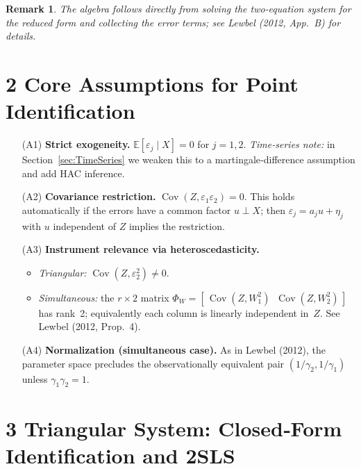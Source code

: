 \documentclass{article}
\newcommand{\E}{\mathbb{E}}
\newcommand{\cov}{\operatorname{Cov}}
\theoremstyle{plain}
\newtheorem{remark}{Remark}
\begin{document}
\begin{remark}
The algebra follows directly from solving the two‑equation system for the
reduced form and collecting the error terms; see Lewbel (2012, App.\ B) for
details.
\end{remark}

\section*{2 \quad Core Assumptions for Point Identification}

\begin{enumerate}
\item[(A1)] \textbf{Strict exogeneity.}
      $\E[\varepsilon_j\mid X]=0$ for $j=1,2$.  
      \emph{Time‑series note:} in Section~\ref{sec:TimeSeries} we weaken this to a martingale‑difference assumption and add HAC inference.

\item[(A2)] \textbf{Covariance restriction.}
      $\cov(Z,\varepsilon_1\varepsilon_2)=0$.  
      This holds automatically if the errors have a common factor
      \(u \perp X\); then \(\varepsilon_j = a_j u + \eta_j\) with
      \(u\) independent of \(Z\) implies the restriction.

\item[(A3)] \textbf{Instrument relevance via heteroscedasticity.}
      \begin{itemize}\itemsep2pt
      \item \emph{Triangular:}
            $\cov(Z,\varepsilon_2^2)\neq0$.
      \item \emph{Simultaneous:}
            the $r\times 2$ matrix
            $\Phi_W = [\,\cov(Z,W_1^2)\;\; \cov(Z,W_2^2)\,]$
            has rank 2; equivalently each column is linearly independent
            in~\(Z\).  See Lewbel (2012, Prop.\ 4).
      \end{itemize}

\item[(A4)] \textbf{Normalization (simultaneous case).}
      As in Lewbel (2012), the parameter space precludes the observationally
      equivalent pair \((1/\gamma_2,1/\gamma_1)\) unless
      \(\gamma_1\gamma_2=1\).
\end{enumerate}

\section*{3 \quad Triangular System: Closed‑Form Identification and 2SLS}
\end{document}
